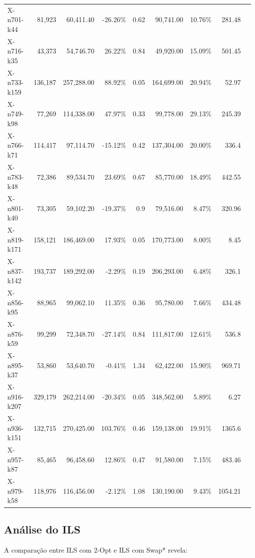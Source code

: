 \documentclass[12pt,a4paper]{article}
\begin{document}
\begin{longtable}{@{}lrrrrrrrr@{}}
    X-n701-k44 & 81,923 & 60,411.40 & -26.26\% & 0.62 & 90,741.00 & 10.76\% & 281.48 \\
    X-n716-k35 & 43,373 & 54,746.70 & 26.22\% & 0.84 & 49,920.00 & 15.09\% & 501.45 \\
    X-n733-k159 & 136,187 & 257,288.00 & 88.92\% & 0.05 & 164,699.00 & 20.94\% & 52.97 \\
    X-n749-k98 & 77,269 & 114,338.00 & 47.97\% & 0.33 & 99,778.00 & 29.13\% & 245.39 \\
    X-n766-k71 & 114,417 & 97,114.70 & -15.12\% & 0.42 & 137,304.00 & 20.00\% & 336.4 \\
    X-n783-k48 & 72,386 & 89,534.70 & 23.69\% & 0.67 & 85,770.00 & 18.49\% & 442.55 \\
    X-n801-k40 & 73,305 & 59,102.20 & -19.37\% & 0.9 & 79,516.00 & 8.47\% & 320.96 \\
    X-n819-k171 & 158,121 & 186,469.00 & 17.93\% & 0.05 & 170,773.00 & 8.00\% & 8.45 \\
    X-n837-k142 & 193,737 & 189,292.00 & -2.29\% & 0.19 & 206,293.00 & 6.48\% & 326.1 \\
    X-n856-k95 & 88,965 & 99,062.10 & 11.35\% & 0.36 & 95,780.00 & 7.66\% & 434.48 \\
    X-n876-k59 & 99,299 & 72,348.70 & -27.14\% & 0.84 & 111,817.00 & 12.61\% & 536.8 \\
    X-n895-k37 & 53,860 & 53,640.70 & -0.41\% & 1.34 & 62,422.00 & 15.90\% & 969.71 \\
    X-n916-k207 & 329,179 & 262,214.00 & -20.34\% & 0.05 & 348,562.00 & 5.89\% & 6.27 \\
    X-n936-k151 & 132,715 & 270,425.00 & 103.76\% & 0.46 & 159,138.00 & 19.91\% & 1365.6 \\
    X-n957-k87 & 85,465 & 96,458.60 & 12.86\% & 0.47 & 91,580.00 & 7.15\% & 483.46 \\
    X-n979-k58 & 118,976 & 116,456.00 & -2.12\% & 1.08 & 130,190.00 & 9.43\% & 1054.21 \\
\end{longtable}

\subsection{Análise do ILS}

A comparação entre ILS com 2-Opt e ILS com Swap* revela:
\end{document}
